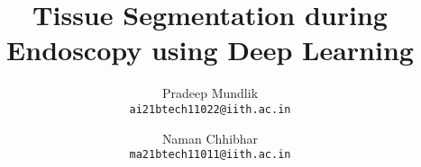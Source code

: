 \documentclass[10pt, twocolumn, letterpaper]{article}
\title{Tissue Segmentation during Endoscopy using Deep Learning}
\author{
    Pradeep Mundlik \\
    {\tt\small ai21btech11022@iith.ac.in}
    \and
    Naman Chhibhar \\
    {\tt\small ma21btech11011@iith.ac.in}
}
\begin{document}
\maketitle
    


% 


{
    \small
    \nocite{*}
    
    
}

% 
\end{document}
